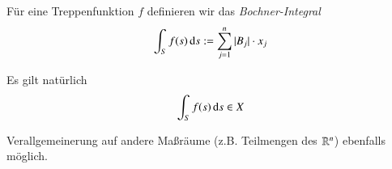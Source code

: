 \begin{defi}\label{4.20}
    Für eine Treppenfunktion $f$ definieren wir das \textit{Bochner-Integral}
    \[
        \int_S f(s)\, \mathrm{d} s:= \sum_{j=1}^n|B_j|\cdot x_j
    \]
\end{defi}

\begin{remark}
    Es gilt natürlich
    \[
        \int_S f(s)\, \mathrm{d} s \in X
    \]
\end{remark}
\begin{remark}
    Verallgemeinerung auf andere Maßräume (z.B. Teilmengen des $\mathbb{R}^n$) ebenfalls möglich.
\end{remark}

